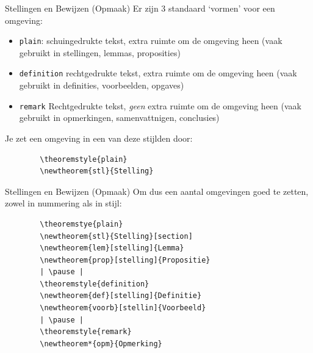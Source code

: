 \begin{frame}[fragile]{Stellingen en Bewijzen (Opmaak)}
    Er zijn 3 standaard `vormen' voor een omgeving:
    \pause
    \begin{itemize}[label={\textbullet}]
        \item \texttt{plain}: schuingedrukte tekst, extra ruimte om de omgeving heen 
            (vaak gebruikt in stellingen, lemmas, proposities)
        \pause
        \item \texttt{definition} rechtgedrukte tekst, extra ruimte om de omgeving heen 
            (vaak gebruikt in definities, voorbeelden, opgaves)
        \pause
        \item \texttt{remark} Rechtgedrukte tekst, \emph{geen} extra ruimte om de omgeving heen 
            (vaak gebruikt in opmerkingen, samenvattnigen, conclusies)
    \end{itemize}
    \pause 
    Je zet een omgeving in een van deze stijlden door:
    \begin{verbatim}
        \theoremstyle{plain}
        \newtheorem{stl}{Stelling}
    \end{verbatim}
\end{frame}

\begin{frame}[fragile]{Stellingen en Bewijzen (Opmaak)}
    Om dus een aantal omgevingen goed te zetten, zowel in nummering als in stijl:
    \begin{verbatim}
        \theoremstye{plain}
        \newtheorem{stl}{Stelling}[section]
        \newtheorem{lem}[stelling]{Lemma}
        \newtheorem{prop}[stelling]{Propositie}
        | \pause |
        \theoremstyle{definition}
        \newtheorem{def}[stelling]{Definitie}
        \newtheorem{voorb}[stellin]{Voorbeeld}
        | \pause |
        \theoremstyle{remark}
        \newtheorem*{opm}{Opmerking}
    \end{verbatim}    
\end{frame}